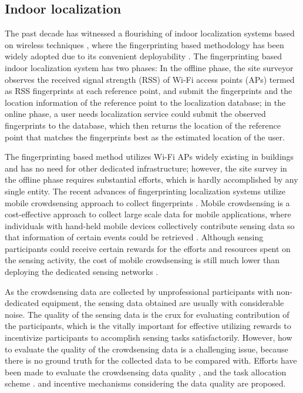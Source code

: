 \documentclass[10pt,conference,compsocconf,letterpaper]{IEEEtran}
\begin{document}
\subsection{Indoor localization}
The past decade has witnessed a flourishing of indoor localization systems based on wireless techniques \cite{ rsscsi}, where the fingerprinting based methodology has been widely adopted due to its convenient deployability \cite{ mobicom04, horus }. The fingerprinting based indoor localization system has two phases: In the offline phase, the site surveyor observes the received signal strength (RSS) of Wi-Fi access points (APs) termed as RSS fingerprints at each reference point, and submit the fingerprints and the location information of the reference point to the localization database; in the online phase, a user needs localization service could submit the observed fingerprints to the database, which then returns the location of the reference point that matches the fingerprints best as the estimated location of the user.   

The fingerprinting based method utilizes Wi-Fi APs widely existing in buildings and has no need for other dedicated infrastructure; however, the site survey in the offline phase requires substantial efforts, which is hardly accomplished by any single entity. The recent advances of fingerprinting localization systems utilize mobile crowdsensing approach to collect fingerprints \cite{wen2015fundamental, Chenshu14, luo2014piloc, shen2013walkie, ez10, Chintalapudi10}. Mobile crowdsensing is a cost-effective approach to collect large scale data for mobile applications, where individuals with hand-held mobile devices collectively contribute sensing data so that information of certain events could be retrieved \cite{crowdsensing, postedpricing}. Although sensing participants could receive certain rewards for the efforts and resources spent on the sensing activity, the cost of mobile crowdsensing is still much lower than deploying the dedicated sensing networks \cite{ crowdsensing}. 


As the crowdsensing data are collected by unprofessional participants with non-dedicated equipment, the sensing data obtained are usually with considerable noise. The quality of the sensing data is the crux for evaluating contribution of the participants, which is the vitally important for effective utilizing rewards to incentivize participants to accomplish sensing tasks satisfactorily. However, how to evaluate the quality of the crowdsensing data is a challenging issue, because there is no ground truth for the collected data to be compared with. Efforts have been made to evaluate the crowdsensing data quality \cite{ Crowdloc14}, and the task allocation scheme \cite{ Taskselection15, recruit}. and incentive mechanisms considering the data quality are proposed. 
\end{document}
